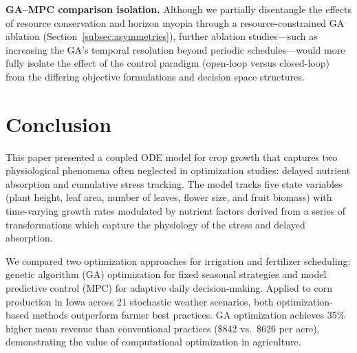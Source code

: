 \documentclass[pdflatex,sn-mathphys-num]{sn-jnl}
\begin{document}
\textbf{GA--MPC comparison isolation.} Although we partially disentangle the effects of resource conservation and horizon myopia through a resource-constrained GA ablation (Section~\ref{subsec:asymmetries}), further ablation studies---such as increasing the GA's temporal resolution beyond periodic schedules---would more fully isolate the effect of the control paradigm (open-loop versus closed-loop) from the differing objective formulations and decision space structures.

\section{Conclusion}\label{sec:conclusion}

This paper presented a coupled ODE model for crop growth that captures two physiological phenomena often neglected in optimization studies: delayed nutrient absorption and cumulative stress tracking. The model tracks five state variables (plant height, leaf area, number of leaves, flower size, and fruit biomass) with time-varying growth rates modulated by nutrient factors derived from a series of transformations which capture the physiology of the stress and delayed absorption.

We compared two optimization approaches for irrigation and fertilizer scheduling: genetic algorithm (GA) optimization for fixed seasonal strategies and model predictive control (MPC) for adaptive daily decision-making. Applied to corn production in Iowa across 21 stochastic weather scenarios, both optimization-based methods outperform farmer best practices. GA optimization achieves 35\% higher mean revenue than conventional practices (\$842 vs.\ \$626 per acre), demonstrating the value of computational optimization in agriculture.
\end{document}
